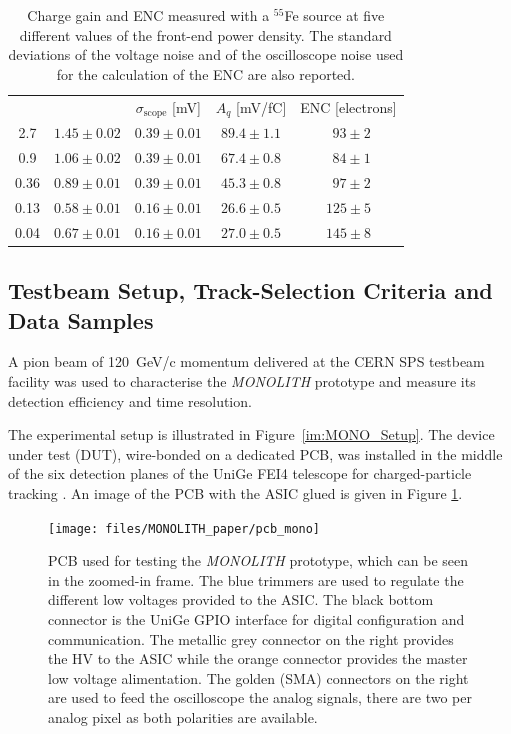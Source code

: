 		\begin{table}[h]
			\centering
			\renewcommand{\arraystretch}{1.3}
			\begin{tabular}{|c|c|c|c|c|}
			\cline{1-5}
			\cline{1-5}
			\ \power [W/cm$^2$] &  \noise [mV] & $\sigma_{\text{scope}}$ [mV] & $A_q$ [mV/fC] & ENC [electrons] \\
			\cline{1-5}
			2.7   & $ 1.45 \pm 0.02 $ & $ 0.39\pm0.01 $ & $89.4 \pm 1.1 $ & $~~93\pm2$ \\
			0.9   & $ 1.06 \pm 0.02 $ & $ 0.39\pm0.01 $ & $67.4 \pm 0.8 $ & $~~84\pm1$ \\
			0.36  & $ 0.89 \pm 0.01 $ & $ 0.39\pm0.01 $ & $45.3 \pm 0.8 $ & $~~97\pm2$ \\
			0.13  & $ 0.58 \pm 0.01 $ & $ 0.16\pm0.01 $ & $26.6 \pm 0.5 $ & $ 125\pm5$ \\
			0.04  & $ 0.67 \pm 0.01 $ & $ 0.16\pm0.01 $ & $27.0 \pm 0.5 $ & $ 145\pm8$ \\
			\cline{1-5}
			\end{tabular}
			\caption{Charge gain and ENC measured with a $^{55}$Fe source at five different values of the front-end power density. The standard deviations  of the voltage noise and of the oscilloscope noise used for the calculation of the ENC are also reported.}
			\label{tab:_MONO_gain} 
		\end{table}

	
		\subsection{Testbeam Setup, Track-Selection Criteria and Data Samples}

		A pion beam of \SI{120}{\giga\electronvolt}/c momentum delivered at the CERN SPS testbeam facility was used to characterise the \textit{MONOLITH} prototype and measure its detection efficiency and time resolution. 

		The experimental setup is illustrated in Figure~\ref{im:MONO_Setup}. The device under test (DUT), wire-bonded on a dedicated PCB, was installed in the middle of the six detection planes of the UniGe FEI4 telescope for charged-particle tracking \cite{telescope}. An image of the PCB with the ASIC glued is given in Figure \ref{im:MONO_pcb}.
		\begin{figure}[h]
			\centering
			\texttt{[image: files/MONOLITH\_paper/pcb\_mono]}
			\caption{PCB used for testing the \textit{MONOLITH} prototype, which can be seen in the zoomed-in frame. The blue trimmers are used to regulate the different low voltages provided to the ASIC. The black bottom connector is the UniGe GPIO interface for digital configuration and communication. The metallic grey connector on the right provides the HV to the ASIC while the orange connector provides the master low voltage alimentation. The golden (SMA) connectors on the right are used to feed the oscilloscope the analog signals, there are two per analog pixel as both polarities are available. }
			\label{im:MONO_pcb} 
		\end{figure}
		
